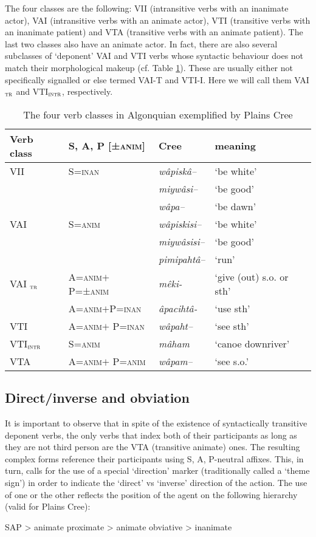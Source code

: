 \documentclass[twoside,a4paper,11pt]{article}
\newcommand{\ipa}[1]{{\phon\textit{#1}}}
\newcommand{\Σ}{\greek{Σ}}
\newcommand{\anim}{\textsc{anim}}
\newcommand{\inan}{\textsc{inan}}
\newcommand{\intr}{\textsc{intr}}
\newcommand{\tr}{\textsc{tr}}
\begin{document}
The four classes are the following: VII (intransitive verbs with an inanimate actor), VAI (intransitive verbs with an animate actor), VTI (transitive verbs with an inanimate patient) and VTA (transitive verbs with an animate patient). The last two classes also have an animate actor. In fact, there are also several subclasses of `deponent' VAI and VTI verbs whose syntactic behaviour does not match their morphological makeup (cf. Table \ref{tab:verbclass}). These are usually either not specifically signalled or else termed VAI-T and VTI-I. Here we will call them VAI$_\tr$ and VTI$_\intr$, respectively.

\begin{table}[htbp]
\caption{The four verb classes in Algonquian exemplified by Plains Cree} \label{tab:verbclass} \centering
\begin{tabular}{llll}
\toprule
Verb class & S, A, P [±\anim] & Cree & meaning\\
\midrule
VII & S=\inan &\ipa{wâpiskâ--} & `be white'\\
& & \ipa{miywâsi--} & `be good' \\
& &\ipa{wâpa--} & `be dawn'\\
VAI & S=\anim & \ipa{wâpiskisi--} & `be white'\\
& &\ipa{miywâsisi--} & `be good'\\
& & \ipa{pimipahtâ--} & `run'\\
VAI $_\tr$ & A=\anim$+$P=±\anim & \ipa{mêki-} & `give (out) s.o. or sth'\\
& A=\anim$+$P=\inan & \ipa{âpacihtâ-} &`use sth'\\
VTI & A=\anim$+$ P=\inan & \ipa{wâpaht--} & `see sth'\\
VTI$_\intr$& S=\anim & \ipa{mâham} & `canoe downriver'\\
VTA & A=\anim$+$ P=\anim & \ipa{wâpam--}& `see s.o.'\\
\bottomrule
\end{tabular}
\end{table}

\subsection{Direct/inverse and obviation}

It is important to observe that in spite of the existence of syntactically transitive deponent verbs, the only verbs that index both of their participants as long as they are not third person are the VTA (transitive animate) ones. The resulting complex forms reference their participants using S, A, P-neutral affixes. This, in turn, calls for the use of a special `direction' marker (traditionally called a `theme sign') in order to indicate the `direct' vs `inverse' direction of the action. The use of one or the other reflects the position of the agent on the following hierarchy (valid for Plains Cree):
\begin{exe}
\ex \label{ex:empathy.cree}
\glt SAP > animate proximate > animate obviative > inanimate
\end{exe}
\end{document}
